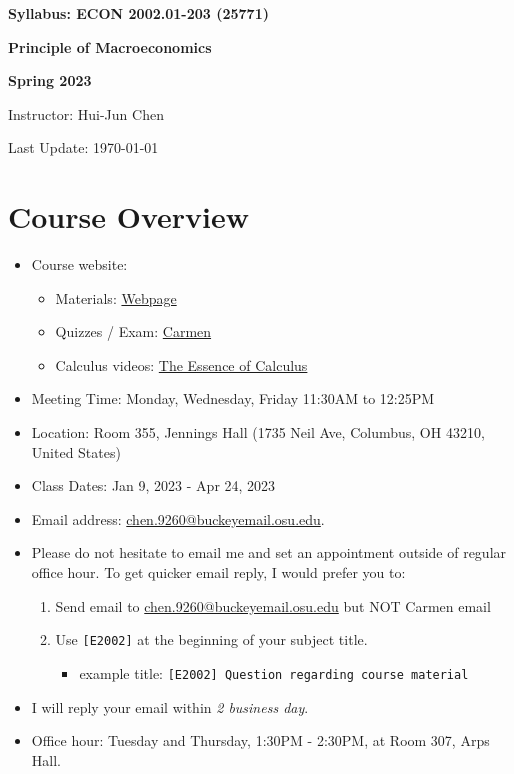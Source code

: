 \documentclass[12pt]{article}
\begin{document}
\centerline{\huge\bf Syllabus: ECON 2002.01-203 (25771)}
\medskip
\centerline{\LARGE \bf Principle of Macroeconomics}
\medskip
\centerline{\LARGE \bf Spring 2023}
\medskip
\centerline{\Large Instructor: Hui-Jun Chen}
\centerline{Last Update: \today}

\medskip

\section*{Course Overview}
\begin{itemize}

    \item Course website:
    \begin{itemize}
        \item Materials: \href{https://huijunchen9260.github.io/PrincipleMacroSpring2023.html}{Webpage}
        \item Quizzes / Exam: \href{https://osu.instructure.com/courses/136855}{Carmen}
        \item Calculus videos: \href{https://www.youtube.com/watch?v=WUvTyaaNkzM&list=PLZHQObOWTQDMsr9K-rj53DwVRMYO3t5Yr}{The Essence of Calculus}
    \end{itemize}
    \item Meeting Time: Monday, Wednesday, Friday 11:30AM to 12:25PM
    \item Location: Room 355, Jennings Hall (1735 Neil Ave, Columbus, OH 43210, United States)
    \item Class Dates: Jan 9, 2023 - Apr 24, 2023
    \item Email address: \href{chen.9260@buckeyemail.osu.edu}{chen.9260@buckeyemail.osu.edu}.
    \item Please do not hesitate to email me and set an appointment outside of regular office hour. To get quicker email reply, I would prefer you to:
    \begin{enumerate}
        \item Send email to \href{chen.9260@buckeyemail.osu.edu}{chen.9260@buckeyemail.osu.edu} but NOT Carmen email
        \item Use \texttt{[E2002]} at the beginning of your subject title.
        \begin{itemize}
            \item example title: \texttt{[E2002] Question regarding course material}
        \end{itemize}
    \end{enumerate}
    \item I will reply your email within \textit{2 business day}.
    \item Office hour: Tuesday and Thursday, 1:30PM - 2:30PM, at Room 307, Arps Hall.
\end{itemize}
\end{document}
